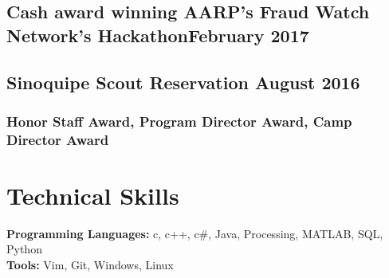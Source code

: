 \documentclass{article}
\begin{document}
\subsection{Cash award winning AARP's Fraud Watch Network's Hackathon\hfill February 2017}
\subsection{Sinoquipe Scout Reservation \hfill August 2016}
\subsubsection{Honor Staff Award, Program Director Award, Camp Director Award}

\section{Technical Skills}

\textbf{Programming Languages:}
c,
c++,
c\#,
Java,
Processing,
MATLAB,
SQL,
Python \\
\textbf{Tools:}
Vim,
Git,
Windows,
Linux
\end{document}
